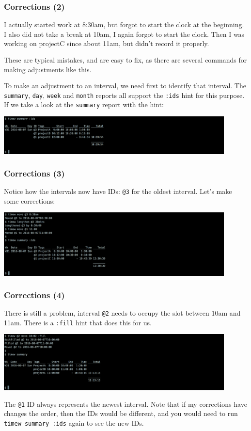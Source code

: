 \documentclass[t,handout]{beamer}
\begin{document}
\begin{frame}[fragile]\frametitle{Corrections (2)}
    I actually started work at 8:30am, but forgot to start the clock at the beginning. I also did not take a break at 10am, I again forgot to start the clock. Then I was working on projectC since about 11am, but didn't record it properly.

    These are typical mistakes, and are easy to fix, as there are several commands for making adjustments like this.

    To make an adjustment to an interval, we need first to identify that interval. The \verb=summary=, \verb=day=, \verb=week= and \verb=month= reports all support the \verb=:ids= hint for this purpose. If we take a look at the \verb=summary= report with the hint:

    \includegraphics[width=12cm]{images/tutorial38.png}
\end{frame}

\begin{frame}[fragile]\frametitle{Corrections (3)}
    Notice how the intervals now have IDs: \verb=@3= for the oldest interval. Let's make some corrections:

    \includegraphics[width=12cm]{images/tutorial39.png}
\end{frame}

\begin{frame}[fragile]\frametitle{Corrections (4)}
    There is still a problem, interval \verb=@2= needs to occupy the slot between 10am and 11am. There is a \verb=:fill= hint that does this for us.

    \includegraphics[width=12cm]{images/tutorial40.png}

    The \verb=@1= ID always represents the newest interval. Note that if my corrections have changes the order, then the IDs would be different, and you would need to run \verb=timew summary :ids= again to see the new IDs.
\end{frame}
\end{document}

